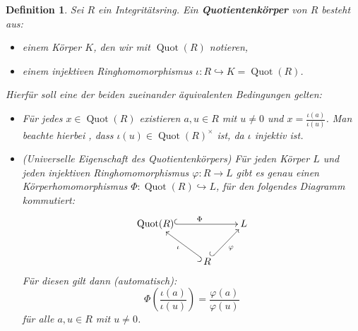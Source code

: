 \documentclass[a4paper, twoside, 11pt, ngerman]{report}
\DeclareMathOperator{\Quot}{Quot}
\theoremstyle{definistyle}
\newtheorem{defini}[satz]{Definition}
\theoremstyle{remark}
\newcommand{\defn}[1]{\textit{\bfseries #1}}
\begin{document}
\begin{defini}\label{def:quotient_koerper}
Sei $R$ ein Integritätsring. Ein \defn{Quotientenkörper} von $R$ besteht aus:
\begin{itemize}
    \item einem Körper $K$, den wir mit $\Quot(R)$ notieren,
    \item einem injektiven Ringhomomorphismus $\iota: R \hookrightarrow K = \Quot(R)$.
\end{itemize}
Hierfür soll eine der beiden zueinander äquivalenten Bedingungen gelten:

\begin{itemize}
    \item[(i)] Für jedes $x \in \Quot(R)$ existieren $a, u \in R$ mit $u \neq 0$ und $x = \frac{\iota(a)}{\iota(u)}$. Man beachte hierbei , dass $\iota(u)\in \Quot(R)^\times$
    ist, da $\iota$ injektiv ist.
    \item[(ii)] (Universelle Eigenschaft des Quotientenkörpers) Für jeden Körper $L$ und jeden injektiven Ringhomomorphismus $\varphi \colon R \to L$ gibt es genau einen Körperhomomorphismus $\Phi \colon \Quot(R) \hookrightarrow L$, für den folgendes Diagramm kommutiert:
    \[
    \begin{xy}
        \xymatrix{
            \Quot(R) \ar@{^{(}->}[rr]^{\Phi} & & L \\
            & R \ar@{^{(}->}[ur]_{\varphi} \ar@{^{(}->}[ul]^{\iota} &
        }
    \end{xy}
    \]
    Für diesen gilt dann (automatisch):
    \[
    \Phi \left( \frac{\iota(a)}{\iota(u)} \right) = \frac{\varphi(a)}{\varphi(u)}
    \]
    für alle $a, u \in R$ mit $u \neq 0$.
\end{itemize}
\end{defini}
\end{document}
